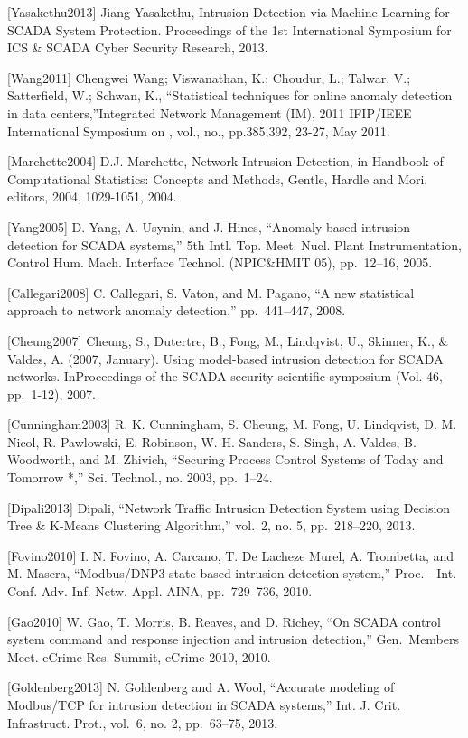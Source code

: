 \documentclass[12pt,]{article}
\begin{document}
{[}Yasakethu2013{]} Jiang Yasakethu, Intrusion Detection via Machine
Learning for SCADA System Protection. Proceedings of the 1st
International Symposium for ICS \& SCADA Cyber Security Research, 2013.

{[}Wang2011{]} Chengwei Wang; Viswanathan, K.; Choudur, L.; Talwar, V.;
Satterfield, W.; Schwan, K., ``Statistical techniques for online anomaly
detection in data centers,''Integrated Network Management (IM), 2011
IFIP/IEEE International Symposium on , vol., no., pp.385,392, 23-27, May
2011.

{[}Marchette2004{]} D.J. Marchette, Network Intrusion Detection, in
Handbook of Computational Statistics: Concepts and Methods, Gentle,
Hardle and Mori, editors, 2004, 1029-1051, 2004.

{[}Yang2005{]} D. Yang, A. Usynin, and J. Hines, ``Anomaly-based
intrusion detection for SCADA systems,'' 5th Intl. Top. Meet. Nucl.
Plant Instrumentation, Control Hum. Mach. Interface Technol. (NPIC\&HMIT
05), pp.~12--16, 2005.

{[}Callegari2008{]} C. Callegari, S. Vaton, and M. Pagano, ``A new
statistical approach to network anomaly detection,'' pp.~441--447, 2008.

{[}Cheung2007{]} Cheung, S., Dutertre, B., Fong, M., Lindqvist, U.,
Skinner, K., \& Valdes, A. (2007, January). Using model-based intrusion
detection for SCADA networks. InProceedings of the SCADA security
scientific symposium (Vol. 46, pp.~1-12), 2007.

{[}Cunningham2003{]} R. K. Cunningham, S. Cheung, M. Fong, U. Lindqvist,
D. M. Nicol, R. Pawlowski, E. Robinson, W. H. Sanders, S. Singh, A.
Valdes, B. Woodworth, and M. Zhivich, ``Securing Process Control Systems
of Today and Tomorrow *,'' Sci. Technol., no. 2003, pp.~1--24.

{[}Dipali2013{]} Dipali, ``Network Traffic Intrusion Detection System
using Decision Tree \& K-Means Clustering Algorithm,'' vol.~2, no. 5,
pp.~218--220, 2013.

{[}Fovino2010{]} I. N. Fovino, A. Carcano, T. De Lacheze Murel, A.
Trombetta, and M. Masera, ``Modbus/DNP3 state-based intrusion detection
system,'' Proc. - Int. Conf. Adv. Inf. Netw. Appl. AINA, pp.~729--736,
2010.

{[}Gao2010{]} W. Gao, T. Morris, B. Reaves, and D. Richey, ``On SCADA
control system command and response injection and intrusion detection,''
Gen.~Members Meet. eCrime Res. Summit, eCrime 2010, 2010.

{[}Goldenberg2013{]} N. Goldenberg and A. Wool, ``Accurate modeling of
Modbus/TCP for intrusion detection in SCADA systems,'' Int. J. Crit.
Infrastruct. Prot., vol.~6, no. 2, pp.~63--75, 2013.
\end{document}
